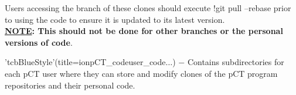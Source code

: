 \begin{tcbenvironment}
\begin{tcbparagraph}
Users accessing the  branch of these clones should execute \tcbinlinebashbox!{git pull --rebase} prior to using the code to ensure it is updated to its latest version.\\[\tcbparskip]

\textbf{\ul{NOTE}: This should not be done for other branches or the personal versions of code}.
\end{tcbparagraph}
\begin{tcbparagraph}'tcbBlueStyle'(title=\dirsep ion\dirsep pCT\_code\dirsep user\_code\dirsep{}\dirsep$\dots$)
$\boldsymbol{-}$ Contains subdirectories for each pCT user where they can store and modify clones of the pCT program repositories and their personal code.
\end{tcbparagraph}
\end{tcbenvironment}
\endinput 